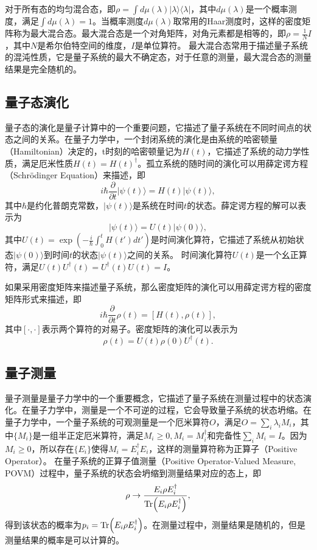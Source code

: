 对于所有态的均匀混合态，即$\rho = \int d\mu(\lambda) |\lambda\rangle\langle\lambda|$，其中$d\mu(\lambda)$是一个概率测度，满足$\int d\mu(\lambda) = 1$。当概率测度$d\mu(\lambda)$取常用的Haar测度时，这样的密度矩阵称为最大混合态。最大混合态是一个对角矩阵，对角元素都是相等的，即$\rho = \frac{1}{N}I$，其中$N$是希尔伯特空间的维度，$I$是单位算符。
最大混合态常用于描述量子系统的混沌性质，它是量子系统的最大不确定态，对于任意的测量，最大混合态的测量结果是完全随机的。

\subsection{量子态演化}
量子态的演化是量子计算中的一个重要问题，它描述了量子系统在不同时间点的状态之间的关系。在量子力学中，一个封闭系统的演化是由系统的哈密顿量（Hamiltonian）决定的，t时刻的哈密顿量记为$H(t)$，它描述了系统的动力学性质，满足厄米性质$H(t) = H(t)^\dagger$。孤立系统的随时间的演化可以用薛定谔方程（Schrödinger Equation）来描述，即
\begin{equation}
    i\hbar\frac{\partial}{\partial t}|\psi(t)\rangle = H(t)|\psi(t)\rangle,
\end{equation}
其中$\hbar$是约化普朗克常数，$|\psi(t)\rangle$是系统在时间$t$的状态。薛定谔方程的解可以表示为
\begin{equation}
    |\psi(t)\rangle = U(t)|\psi(0)\rangle,
\end{equation}
其中$U(t) = \exp\left(-\frac{i}{\hbar}\int_0^t H(t')dt'\right)$是时间演化算符，它描述了系统从初始状态$|\psi(0)\rangle$到时间$t$的状态$|\psi(t)\rangle$之间的关系。
时间演化算符$U(t)$是一个幺正算符，满足$U(t)U^\dagger(t) = U^\dagger(t)U(t) = I$。


如果采用密度矩阵来描述量子系统，那么密度矩阵的演化可以用薛定谔方程的密度矩阵形式来描述，即
\begin{equation}
    i\hbar\frac{\partial}{\partial t}\rho(t) = [H(t), \rho(t)],
\end{equation}
其中$[\cdot, \cdot]$表示两个算符的对易子。密度矩阵的演化可以表示为
\begin{equation}
    \rho(t) = U(t)\rho(0)U^\dagger(t).
\end{equation}

\subsection{量子测量}
量子测量是量子力学中的一个重要概念，它描述了量子系统在测量过程中的状态演化。在量子力学中，测量是一个不可逆的过程，它会导致量子系统的状态坍缩。在量子力学中，一个量子系统的可观测量是一个厄米算符$O$，满足$O=\sum_i \lambda_i M_i$，其中$\{M_i\}$是一组半正定厄米算符，满足$M_i \geq 0,M_i=M_i^\dagger$和完备性$\sum_i M_i = I$。因为$M_i \geq 0$，所以存在$\{E_i\}$使得$M_i = E_i^\dagger E_i$，这样的测量算符称为正算子（Positive Operator）。
在量子系统的正算子值测量（Positive Operator-Valued Measure, POVM）过程中，量子系统的状态会坍缩到测量结果对应的态上，即
\begin{equation}
    \rho \rightarrow \frac{E_i\rho E_i^\dagger}{\Tr(E_i\rho E_i^\dagger)},
\end{equation}
得到该状态的概率为$p_i = \Tr(E_i\rho E_i^\dagger)$。在测量过程中，测量结果是随机的，但是测量结果的概率是可以计算的。



